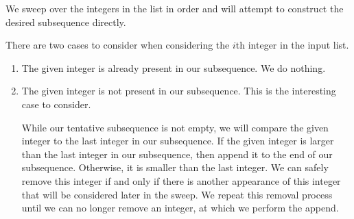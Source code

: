 
\noindent

We sweep over the integers in the list in order and will attempt to construct
the desired subsequence directly.

There are two cases to consider when considering the $i$th integer in the input
list.

\begin{enumerate}
\item The given integer is already present in our subsequence. We do nothing.
\item The given integer is not present in our subsequence. This is the
interesting case to consider.

While our tentative subsequence is not empty, we will compare the given integer
to the last integer in our subsequence. If the given integer is larger than
the last integer in our subsequence, then append it to the end
of our subsequence. Otherwise, it is smaller than the last integer. We can
safely remove this integer if and only if there is another appearance of this
integer that will be considered later in the sweep. We repeat this removal
process until we can no longer remove an integer, at which we perform the
append.
\end{enumerate}
